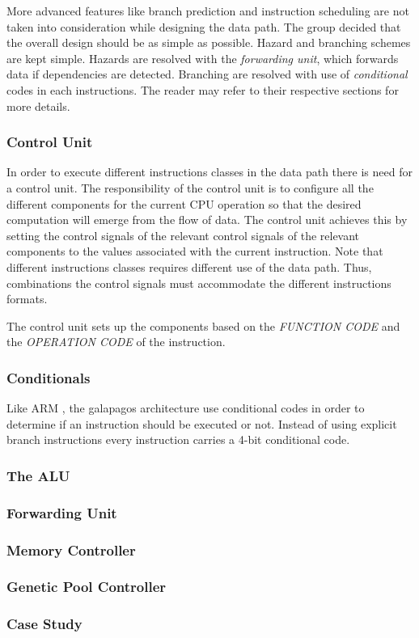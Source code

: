 More advanced features like branch prediction and instruction scheduling are not taken into consideration while designing the data path. The group decided that the overall design should be as simple as possible. Hazard and branching schemes are kept simple. Hazards are resolved with the \emph{forwarding unit}, which forwards data if dependencies are detected. Branching are resolved with use of \emph{conditional} codes in each instructions. The reader may refer to their respective sections for more details.



\subsubsection{Control Unit} \label{fpga:fitness:sss:control_unit}
In order to execute different instructions classes in the data path there is need for a control unit. The responsibility of the control unit is to configure all the different components for the current CPU operation so that the desired computation will emerge from the flow of data. The control unit achieves this by setting the control signals of the relevant control signals of the relevant components to the values associated with the current instruction. Note that different instructions classes requires different use of the data path. Thus, combinations the control signals must accommodate the different instructions formats. 



The control unit sets up the components based on the \emph{FUNCTION CODE} and the \emph{OPERATION CODE} of the instruction.     



\subsubsection{Conditionals} \label{fpga:fitness:sss:conditionals}
Like ARM , the galapagos architecture use conditional codes in order to determine if an instruction should be executed or not. Instead of using explicit branch instructions every instruction carries a 4-bit conditional code. 


\subsubsection{The ALU}\label{fpga:fitness:sss:the_alu}

\subsubsection{Forwarding Unit} \label{fpga:fitness:sss:forwarding_unit}

\subsubsection{Memory Controller} \label{fpga:fitness:sss:memory_controller}

\subsubsection{Genetic Pool Controller} \label{fpga:fitness:sss:genetic_pool_controller}

\subsubsection{Case Study} \label{fpga:fitness:sss:case_study}




